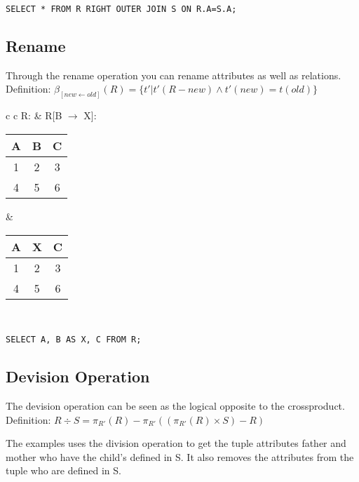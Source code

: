 \lstset{language=SQL,tabsize=4,captionpos=b,frame=single,
basicstyle=\footnotesize}
\begin{lstlisting}[caption=Right-Outer-Join]
SELECT * FROM R RIGHT OUTER JOIN S ON R.A=S.A;
\end{lstlisting}

\subsection{Rename}
Through the rename operation you can rename attributes as well as relations.\\
Definition: $\beta_{[new \leftarrow old]}(R) = \{t' | t' (R - new) \land t'(new)
= t(old)\}$\\

\begin{tabular}{ c c}
	R: & R[B $\rightarrow$ X]:\\
	\begin{tabular}{|c|c|c|}
		\hline
		A & B & C\\
		\hline
		1 & 2 & 3\\
		\hline
		4 & 5 & 6\\
		\hline
	\end{tabular} &

	\begin{tabular}{|c|c|c|}
		\hline
		A & X & C\\
		\hline
		1 & 2 & 3\\
		\hline
		4 & 5 & 6\\
		\hline
	\end{tabular}
\end{tabular}\\

\lstset{language=SQL,tabsize=4,captionpos=b,frame=single,
basicstyle=\footnotesize}
\begin{lstlisting}[caption=Right-Outer-Join]
SELECT A, B AS X, C FROM R;
\end{lstlisting}

\subsection{Devision Operation}
The devision operation can be seen as the logical opposite to the
crossproduct.\\
Definition: $R \div S = \pi_{R'}(R) - \pi_{R'}((\pi_{R'}(R) \times S) - R)$

The examples uses the division operation to get the tuple attributes father and
mother who have the child's defined in S. It also removes the attributes from
the tuple who are defined in S.\\

